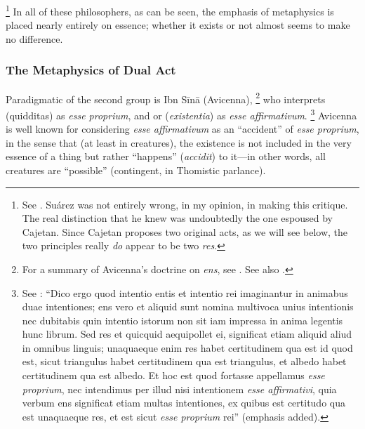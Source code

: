 %
\footnote{See \cite[148--149]{gilson:letre}. Suárez was not entirely wrong, in my opinion, in making this critique. The real distinction that he knew was undoubtedly the one espoused by Cajetan. Since Cajetan proposes two original acts, as we will see below, the two principles really \emph{do} appear to be two \emph{res}.} In all of these philosophers, as can be seen, the emphasis of metaphysics is placed nearly entirely on essence; whether it exists or not almost seems to make no difference.

\subsubsection{The Metaphysics of Dual Act}

Paradigmatic of the second group is Ibn Sīnā (Avicenna),%
%
\footnote{For a summary of Avicenna's doctrine on \emph{ens}, see \cite[124--132]{gilson:letre}. See also \cite[375--376]{contat:etant}.}
%
who interprets  (quidditas) as \emph{esse proprium}, and  or  (\emph{existentia}) as \emph{esse affirmativum}.%
%
\footnote{See \cite[Tract.~I, sec.~5, {[31]}, 34-35]{avicenna:metaphysics}: ``Dico ergo quod intentio entis et intentio rei imaginantur in animabus duae intentiones; ens vero et aliquid sunt nomina multivoca unius intentionis nec dubitabis quin intentio istorum non sit iam impressa in anima legentis hunc librum. Sed res et quicquid aequipollet ei, significat etiam aliquid aliud in omnibus linguis; unaquaeque enim res habet certitudinem qua est id quod est, sicut triangulus habet certitudinem qua est triangulus, et albedo habet certitudinem qua est albedo. Et hoc est quod fortasse appellamus \emph{esse proprium}, nec intendimus per illud nisi intentionem \emph{esse affirmativi}, quia verbum ens significat etiam multas intentiones, ex quibus est certitudo qua est unaquaeque res, et est sicut \emph{esse proprium} rei'' (emphasis added).} Avicenna is well known for considering \emph{esse affirmativum} as an ``accident'' of \emph{esse proprium}, in the sense that (at least in creatures), the existence is not included in the very essence of a thing but rather ``happens'' (\emph{accidit}) to it---in other words, all creatures are ``possible'' (contingent, in Thomistic parlance).%
%

